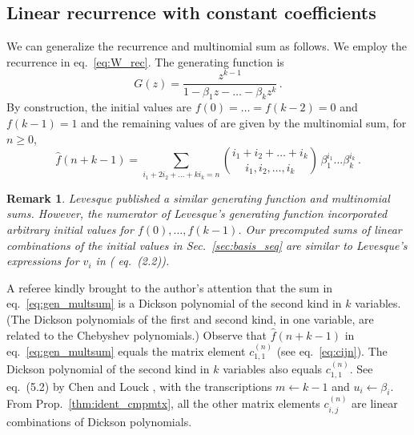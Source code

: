\documentclass[review]{elsarticle}
\theoremstyle{plain}
\newtheorem{remark}[theorem]{Remark}
\begin{document}
\subsection{Linear recurrence with constant coefficients}\label{sec:more_gen}
We can generalize the recurrence and multinomial sum as follows.
We employ the recurrence in eq.~\eqref{eq:W_rec}.
The generating function is
\begin{equation}
G(z) = \frac{z^{k-1}}{1-\beta_1z-\dots-\beta_kz^k} \,.
\end{equation}
By construction, the initial values are $f(0)=\dots=f(k-2)=0$ and $f(k-1)=1$
and the remaining values of are given by the multinomial sum, for $n\ge0$,
\begin{equation}
\label{eq:gen_multsum}
\hat{f}(n+k-1) = \sum_{i_1+2i_2+\dots+ki_k = n} \binom{i_1+i_2+\dots+i_k}{i_1,i_2,\dots, i_k}\,\beta_1^{i_1}\dots\beta_k^{i_k} \,.
\end{equation}
\begin{remark}
Levesque \cite{Levesque1985} published a similar generating function and multinomial sums.
However, the numerator of Levesque's generating function incorporated arbitrary initial values for $f(0),\dots,f(k-1)$.
Our precomputed sums of linear combinations of the initial values in Sec.~\ref{sec:basis_seq} are similar to
Levesque's expressions for $v_i$ in (\cite{Levesque1985} eq.~(2.2)).
\end{remark}
A referee kindly brought to the author's attention that the sum in eq.~\eqref{eq:gen_multsum}
is a Dickson polynomial of the second kind in $k$ variables.
(The Dickson polynomials of the first and second kind, in one variable, are related to the Chebyshev polynomials.)
Observe that $\hat{f}(n+k-1)$ in eq.~\eqref{eq:gen_multsum} equals the matrix element $c_{1,1}^{(n)}$ (see eq.~\eqref{eq:cijn}).
The Dickson polynomial of the second kind in $k$ variables also equals $c_{1,1}^{(n)}$.
See eq.~(5.2) by Chen and Louck \cite{ChenLouck}, with the transcriptions $m\gets k-1$ and $u_i \gets \beta_i$.
From Prop.~\ref{thm:ident_cmpmtx}, all the other matrix elements $c_{i,j}^{(n)}$ are linear combinations of Dickson polynomials.
\end{document}
